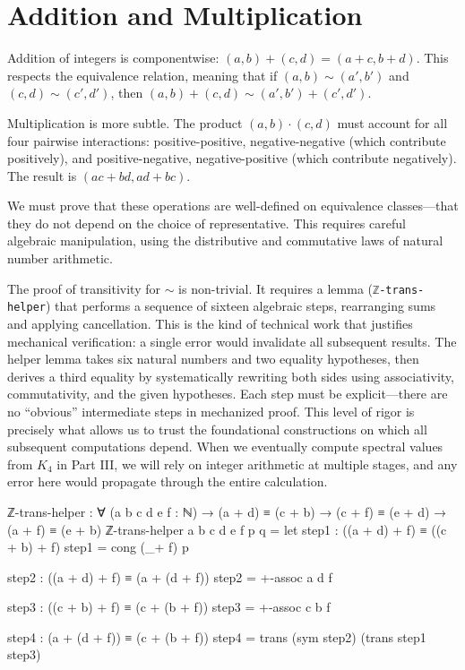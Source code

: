 \documentclass[11pt,a4paper]{book}
\begin{document}
\section{Addition and Multiplication}

Addition of integers is componentwise: $(a,b) + (c,d) = (a+c, b+d)$. This respects 
the equivalence relation, meaning that if $(a,b) \sim (a',b')$ and $(c,d) \sim (c',d')$, 
then $(a,b) + (c,d) \sim (a',b') + (c',d')$.

Multiplication is more subtle. The product $(a,b) \cdot (c,d)$ must account for all 
four pairwise interactions: positive-positive, negative-negative (which contribute 
positively), and positive-negative, negative-positive (which contribute negatively). 
The result is $(ac + bd, ad + bc)$.

We must prove that these operations are well-defined on equivalence classes—that they 
do not depend on the choice of representative. This requires careful algebraic manipulation, 
using the distributive and commutative laws of natural number arithmetic.

The proof of transitivity for $\sim$ is non-trivial. It requires a lemma (\texttt{ℤ-trans-helper}) 
that performs a sequence of sixteen algebraic steps, rearranging sums and applying 
cancellation. This is the kind of technical work that justifies mechanical verification: 
a single error would invalidate all subsequent results. The helper lemma takes six natural 
numbers and two equality hypotheses, then derives a third equality by systematically 
rewriting both sides using associativity, commutativity, and the given hypotheses. Each 
step must be explicit—there are no ``obvious'' intermediate steps in mechanized proof. 
This level of rigor is precisely what allows us to trust the foundational constructions 
on which all subsequent computations depend. When we eventually compute spectral values 
from $K_4$ in Part III, we will rely on integer arithmetic at multiple stages, and any 
error here would propagate through the entire calculation.

\begin{code}
ℤ-trans-helper : ∀ (a b c d e f : ℕ)
               → (a + d) ≡ (c + b)
               → (c + f) ≡ (e + d)
               → (a + f) ≡ (e + b)
ℤ-trans-helper a b c d e f p q =
  let
    step1 : ((a + d) + f) ≡ ((c + b) + f)
    step1 = cong (_+ f) p
    
    step2 : ((a + d) + f) ≡ (a + (d + f))
    step2 = +-assoc a d f
    
    step3 : ((c + b) + f) ≡ (c + (b + f))
    step3 = +-assoc c b f
    
    step4 : (a + (d + f)) ≡ (c + (b + f))
    step4 = trans (sym step2) (trans step1 step3)
    
\end{code}
\end{document}
